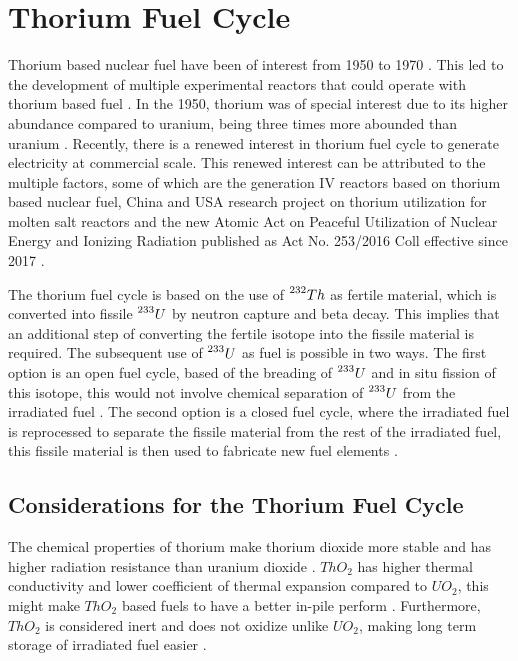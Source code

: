 \chapter{Thorium Fuel Cycle}

Thorium based nuclear fuel have been of interest from 1950 to 1970 \cite{Th_cycle_viability}. This led to the development of multiple experimental reactors that could operate with thorium based fuel \cite{TMSR_book}. In the 1950, thorium was of special interest due to its higher abundance compared to uranium, being three times more abounded than uranium \cite{Th_cycle_viability,TMSR_book}. Recently, there is a renewed interest in thorium fuel cycle to generate electricity at commercial scale. This renewed interest can be attributed to the multiple factors, some of which are the generation IV reactors based on thorium based nuclear fuel, China and USA research project on thorium utilization for molten salt reactors and the new Atomic Act on Peaceful Utilization of Nuclear Energy and Ionizing Radiation published as Act No. 253/2016 Coll effective since 2017 \cite{Th_cycle_viability}.     

The thorium fuel cycle is based on the use of \(\prescript{232}{}{Th}\) as fertile material, which is converted into fissile \(\prescript{233}{}{U}\) by neutron capture and beta decay. This implies that an additional step of converting the fertile isotope into the fissile material is required. The subsequent use of \(\prescript{233}{}{U}\) as fuel is possible in two ways. The first option is an open fuel cycle, based of the breading of \(\prescript{233}{}{U}\) and in situ fission of this isotope, this would not involve chemical separation of \(\prescript{233}{}{U}\) from the irradiated fuel \cite{IAEA_Th_Potential}. The second option is a closed fuel cycle, where the irradiated fuel is reprocessed to separate the fissile material from the rest of the irradiated fuel, this fissile material is then used to fabricate new fuel elements \cite{IAEA_Th_Potential}. 

\section{Considerations for the Thorium Fuel Cycle}

The chemical properties of thorium make thorium dioxide more stable and has higher radiation resistance than uranium dioxide \cite{IAEA_Th_Potential}. \(ThO_2\) has higher thermal conductivity and lower coefficient of thermal expansion compared to \(UO_2\), this might make \(ThO_2\) based fuels to have a better in-pile perform \cite{IAEA_Th_Potential}. Furthermore, \(ThO_2\) is considered inert and does not oxidize unlike \(UO_2\), making long term storage of irradiated fuel easier \cite{IAEA_Th_Potential}.

